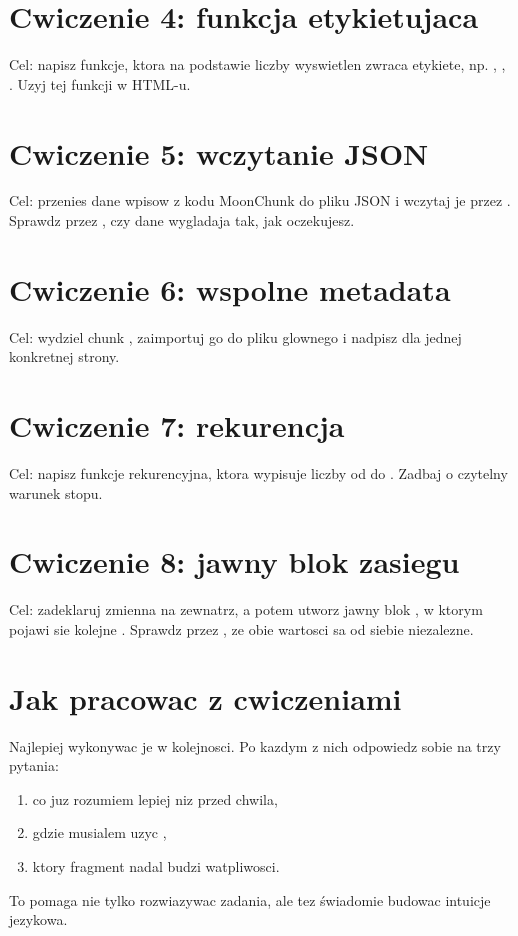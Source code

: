 \section{Cwiczenie 4: funkcja etykietujaca}
Cel: napisz funkcje, ktora na podstawie liczby wyswietlen zwraca etykiete,
np. , , . Uzyj tej funkcji w HTML-u.

\section{Cwiczenie 5: wczytanie JSON}
Cel: przenies dane wpisow z kodu MoonChunk do pliku JSON i wczytaj je przez .
Sprawdz przez , czy dane wygladaja tak, jak oczekujesz.

\section{Cwiczenie 6: wspolne metadata}
Cel: wydziel chunk , zaimportuj go do pliku glownego i nadpisz 
dla jednej konkretnej strony.

\section{Cwiczenie 7: rekurencja}
Cel: napisz funkcje rekurencyjna, ktora wypisuje liczby od  do . Zadbaj o
czytelny warunek stopu.

\section{Cwiczenie 8: jawny blok zasiegu}
Cel: zadeklaruj zmienna  na zewnatrz, a potem utworz jawny blok ,
w ktorym pojawi sie kolejne . Sprawdz przez , ze obie wartosci sa
od siebie niezalezne.

\section{Jak pracowac z cwiczeniami}
Najlepiej wykonywac je w kolejnosci. Po kazdym z nich odpowiedz sobie na trzy pytania:

\begin{enumerate}
  \item co juz rozumiem lepiej niz przed chwila,
  \item gdzie musialem uzyc ,
  \item ktory fragment nadal budzi watpliwosci.
\end{enumerate}

To pomaga nie tylko rozwiazywac zadania, ale tez świadomie budowac intuicje jezykowa.
